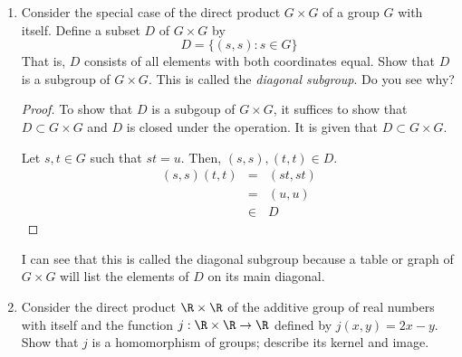 \documentclass[letterpaper]{article}
\begin{document}
\begin{enumerate}
\begin{proof}
\begin{itemize}
\item $\ker(\rho_0)=\{(e_0,s_1): \forall s_1 \in G_1\}$, where $e_0$ is the identity of $G_0$.

\item $\rho_1$ is surjective because given any $s_1 \in G_1$, we can choose an arbitrary $s_0 \in G_0$ and find that $\rho_1(s_0,s_1)=s_1$. 

\item $\rho_0$ is a homomorphism because 
\[
\begin{array}{rcl}
\rho_1((s_0,s_1)(t_0,t_1)) &=& \rho_1(s_0t_0,s_1t_1)\\
&=& s_1t_1\\
&=& (s_1)(t_1)\\
&=& \rho_1(s_0,s_1)\rho_1(t_0,t_1)\\
\end{array}
\]

\item $\ker(\rho_1)=\{(s_0,e_1): \forall s_0 \in G_0\}$, where $e_1$ is the identity of $G_1$.
\end{itemize}
\end{proof}

\item Consider the special case of the direct product $G\times G$ of a group $G$ with itself. Define a subset $D$ of $G\times G$ by 
$$D=\{(s,s):s\in G\}$$
That is, $D$ consists of all elements with both coordinates equal. Show that $D$ is a subgroup of $G\times G$. This is called the \emph{diagonal subgroup}. Do you see why? 

\begin{proof}
To show that $D$ is a subgoup of $G\times G$, it suffices to show that $D\subset G\times G$ and $D$ is closed under the operation. It is given that $D\subset G\times G$. 

Let $s,t \in G$ such that $st = u$. Then, $(s,s),(t,t) \in D$. 
\[
\begin{array}{rcl}
(s,s)(t,t)&=&(st,st)\\
&=&(u,u)\\
&\in&D
\end{array}
\]
\end{proof}

I can see that this is called the diagonal subgroup because a table or graph of $G\times G$ will list the elements of $D$ on its main diagonal. 

\item Consider the direct product $\R\times\R$ of the additive group of real numbers with itself and the function $j:\R\times\R\to\R$ defined by $j(x,y)=2x-y$. Show that $j$ is a homomorphism of groups; describe its kernel and image. 


\end{enumerate}
\end{document}
